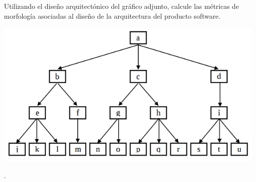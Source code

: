 Utilizando el diseño arquitectónico del gráfico adjunto, calcule las métricas de morfología asociadas al diseño de la arquitectura del producto software.

\begin{center}
\includegraphics[width=.9\textwidth]{assets/weird-thing.png}
\end{center}
.
